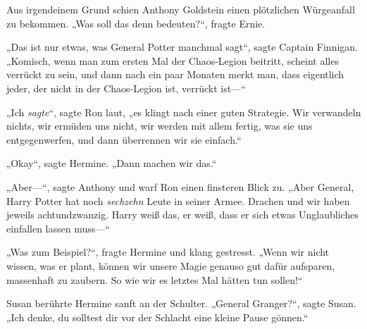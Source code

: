 Aus irgendeinem Grund schien Anthony Goldstein einen plötzlichen Würgeanfall zu bekommen. „Was soll das denn bedeuten?“, fragte Ernie.

„Das ist nur etwas, was General Potter manchmal sagt“, sagte Captain Finnigan. „Komisch, wenn man zum ersten Mal der Chaos-Legion beitritt, scheint alles verrückt zu sein, und dann nach ein paar Monaten merkt man, dass eigentlich jeder, der nicht in der Chaos-Legion ist, verrückt ist—“

„Ich \emph{sagte}“, sagte Ron laut, „es klingt nach einer guten Strategie. Wir verwandeln nichts, wir ermüden uns nicht, wir werden mit allem fertig, was sie uns entgegenwerfen, und dann überrennen wir sie einfach.“

„Okay“, sagte Hermine. „Dann machen wir das.“

„Aber—“, sagte Anthony und warf Ron einen finsteren Blick zu. „Aber General, Harry Potter hat noch \emph{sechzehn} Leute in seiner Armee. Drachen und wir haben jeweils achtundzwanzig. Harry weiß das, er weiß, dass er sich etwas Unglaubliches einfallen lassen muss—“

„Was zum Beispiel?“, fragte Hermine und klang gestresst. „Wenn wir nicht wissen, was er plant, können wir unsere Magie genauso gut dafür aufsparen, massenhaft  zu zaubern. So wie wir es letztes Mal hätten tun sollen!“

Susan berührte Hermine sanft an der Schulter. „General Granger?“, sagte Susan. „Ich denke, du solltest dir vor der Schlacht eine kleine Pause gönnen.“

